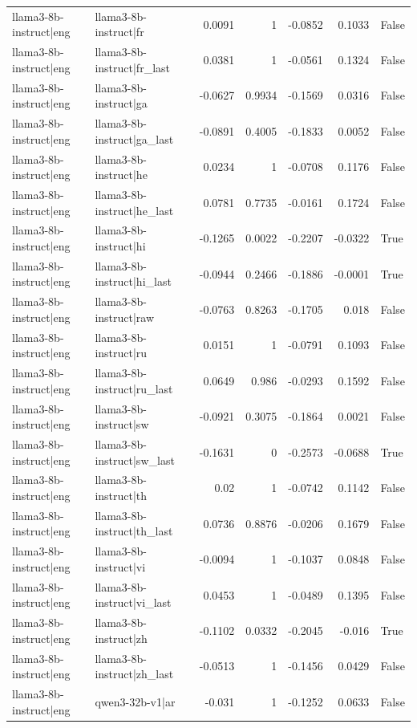 \begin{table}
\begin{tabular}{l l r r r r l}
llama3-8b-instruct|eng & llama3-8b-instruct|fr & 0.0091 & 1 & -0.0852 & 0.1033 & False \\
llama3-8b-instruct|eng & llama3-8b-instruct|fr_last & 0.0381 & 1 & -0.0561 & 0.1324 & False \\
llama3-8b-instruct|eng & llama3-8b-instruct|ga & -0.0627 & 0.9934 & -0.1569 & 0.0316 & False \\
llama3-8b-instruct|eng & llama3-8b-instruct|ga_last & -0.0891 & 0.4005 & -0.1833 & 0.0052 & False \\
llama3-8b-instruct|eng & llama3-8b-instruct|he & 0.0234 & 1 & -0.0708 & 0.1176 & False \\
llama3-8b-instruct|eng & llama3-8b-instruct|he_last & 0.0781 & 0.7735 & -0.0161 & 0.1724 & False \\
llama3-8b-instruct|eng & llama3-8b-instruct|hi & -0.1265 & 0.0022 & -0.2207 & -0.0322 & True \\
llama3-8b-instruct|eng & llama3-8b-instruct|hi_last & -0.0944 & 0.2466 & -0.1886 & -0.0001 & True \\
llama3-8b-instruct|eng & llama3-8b-instruct|raw & -0.0763 & 0.8263 & -0.1705 & 0.018 & False \\
llama3-8b-instruct|eng & llama3-8b-instruct|ru & 0.0151 & 1 & -0.0791 & 0.1093 & False \\
llama3-8b-instruct|eng & llama3-8b-instruct|ru_last & 0.0649 & 0.986 & -0.0293 & 0.1592 & False \\
llama3-8b-instruct|eng & llama3-8b-instruct|sw & -0.0921 & 0.3075 & -0.1864 & 0.0021 & False \\
llama3-8b-instruct|eng & llama3-8b-instruct|sw_last & -0.1631 & 0 & -0.2573 & -0.0688 & True \\
llama3-8b-instruct|eng & llama3-8b-instruct|th & 0.02 & 1 & -0.0742 & 0.1142 & False \\
llama3-8b-instruct|eng & llama3-8b-instruct|th_last & 0.0736 & 0.8876 & -0.0206 & 0.1679 & False \\
llama3-8b-instruct|eng & llama3-8b-instruct|vi & -0.0094 & 1 & -0.1037 & 0.0848 & False \\
llama3-8b-instruct|eng & llama3-8b-instruct|vi_last & 0.0453 & 1 & -0.0489 & 0.1395 & False \\
llama3-8b-instruct|eng & llama3-8b-instruct|zh & -0.1102 & 0.0332 & -0.2045 & -0.016 & True \\
llama3-8b-instruct|eng & llama3-8b-instruct|zh_last & -0.0513 & 1 & -0.1456 & 0.0429 & False \\
llama3-8b-instruct|eng & qwen3-32b-v1|ar & -0.031 & 1 & -0.1252 & 0.0633 & False \\

\end{tabular}
\end{table}
